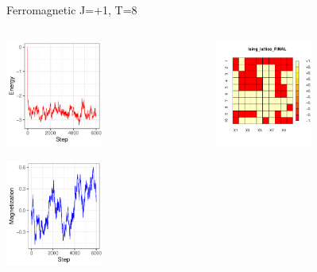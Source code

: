 \documentclass{beamer}
\begin{document}
\begin{frame}{Ferromagnetic J=+1, T=8}
\begin{columns}
\begin{column}{0.5\textwidth}
    \begin{center}
     \includegraphics[width=0.5\textwidth]{Pic/J+1_10_6000_T=8_ENERGY.pdf}
     \end{center}
         \begin{center}
     \includegraphics[width=0.5\textwidth]{Pic/J+1_10_6000_T=8_Magnetization.pdf}
     \end{center}
\end{column}
\begin{column}{0.5\textwidth}
    \begin{center}
     \includegraphics[width=0.5\textwidth]{Pic/J+1_10_6000_T=8_FINAL.pdf}

\end{center}
\end{column}
\end{columns}
\end{frame}
\end{document}
